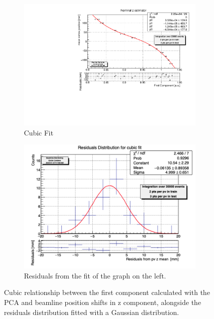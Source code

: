 \begin{figure}
    \centering
    \begin{subfigure}{0.48\textwidth}
    \includegraphics[width=\linewidth]{figures/z_cubic_fit.pdf}
    \caption{Cubic Fit}\label{fig:zfit_cubic_MC}
    \end{subfigure}
    \begin{subfigure}{0.48\textwidth}
    \includegraphics[width=\linewidth]{figures/z_cubic_res.png}
    \caption{Residuals from the fit of the graph on the left. }\label{fig:zres_cubic_MC}
    \end{subfigure}
    \caption{Cubic relationship between the first component calculated with the PCA and beamline position shifts in z component, alongside the residuals distribution fitted with a Gaussian distribution.}
    \label{fig:z_cubic_MC}
\end{figure}

